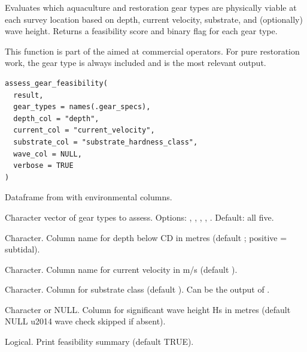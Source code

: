 \documentclass[a4paper]{book}
\begin{document}
%
\begin{Description}
Evaluates which aquaculture and restoration gear types are physically viable
at each survey location based on depth, current velocity, substrate, and
(optionally) wave height. Returns a feasibility score and binary flag for
each gear type.

This function is part of the  aimed at commercial
operators. For pure restoration work, the  gear type is
always included and is the most relevant output.
\end{Description}
%
\begin{Usage}
\begin{verbatim}
assess_gear_feasibility(
  result,
  gear_types = names(.gear_specs),
  depth_col = "depth",
  current_col = "current_velocity",
  substrate_col = "substrate_hardness_class",
  wave_col = NULL,
  verbose = TRUE
)
\end{verbatim}
\end{Usage}
%
\begin{Arguments}
\begin{ldescription}
\item[\code{result}] Dataframe from  with environmental columns.

\item[\code{gear\_types}] Character vector of gear types to assess. Options:
, , , ,
. Default: all five.

\item[\code{depth\_col}] Character. Column name for depth below CD in metres
(default ; positive = subtidal).

\item[\code{current\_col}] Character. Column name for current velocity in m/s
(default ).

\item[\code{substrate\_col}] Character. Column for substrate class
(default ). Can be the output of
.

\item[\code{wave\_col}] Character or NULL. Column for significant wave height Hs
in metres (default NULL \bsl{}u2014 wave check skipped if absent).

\item[\code{verbose}] Logical. Print feasibility summary (default TRUE).
\end{ldescription}
\end{Arguments}
\end{document}
